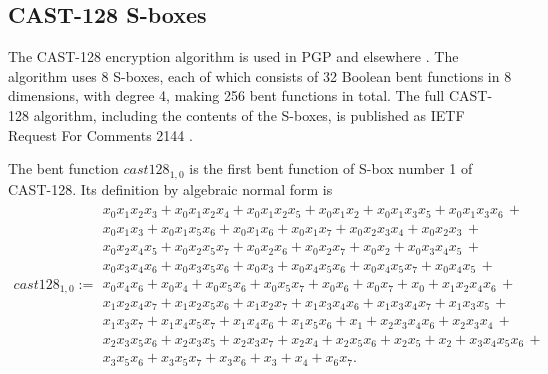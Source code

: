 \documentclass[12pt,a4paper]{article}
\begin{document}
\newpage
\subsection{CAST-128 S-boxes}
%
The CAST-128 encryption algorithm is used in PGP and elsewhere \cite{Ada97}.
The algorithm uses 8 S-boxes, each of which consists of 32 Boolean bent functions in 8 dimensions,
with degree 4, making 256 bent functions in total.
The full CAST-128 algorithm, including the contents of the S-boxes,
is published as IETF Request For Comments 2144 \cite{RFC2144}.

The bent function $cast128_{1,0}$ is the first bent function of S-box number 1 of CAST-128.
Its definition by algebraic normal form is
\footnotesize{}
\begin{align*}
cast128_{1,0} :=
\begin{array}{l}
x_{0} x_{1} x_{2} x_{3} + x_{0} x_{1} x_{2} x_{4} + x_{0} x_{1} x_{2} x_{5} + x_{0} x_{1} x_{2} + x_{0} x_{1} x_{3} x_{5} + x_{0} x_{1} x_{3} x_{6}\, +
\\
x_{0} x_{1} x_{3} + x_{0} x_{1} x_{5} x_{6} + x_{0} x_{1} x_{6} + x_{0} x_{1} x_{7} + x_{0} x_{2} x_{3} x_{4} + x_{0} x_{2} x_{3}\, +
\\
x_{0} x_{2} x_{4} x_{5} + x_{0} x_{2} x_{5} x_{7} + x_{0} x_{2} x_{6} + x_{0} x_{2} x_{7} + x_{0} x_{2} + x_{0} x_{3} x_{4} x_{5}\, +
\\
x_{0} x_{3} x_{4} x_{6} + x_{0} x_{3} x_{5} x_{6} + x_{0} x_{3} + x_{0} x_{4} x_{5} x_{6} + x_{0} x_{4} x_{5} x_{7} + x_{0} x_{4} x_{5}\, +
\\
x_{0} x_{4} x_{6} + x_{0} x_{4} + x_{0} x_{5} x_{6} + x_{0} x_{5} x_{7} + x_{0} x_{6} + x_{0} x_{7} + x_{0} + x_{1} x_{2} x_{4} x_{6}\, +
\\
x_{1} x_{2} x_{4} x_{7} + x_{1} x_{2} x_{5} x_{6} + x_{1} x_{2} x_{7} + x_{1} x_{3} x_{4} x_{6} + x_{1} x_{3} x_{4} x_{7} + x_{1} x_{3} x_{5}\, +
\\
x_{1} x_{3} x_{7} + x_{1} x_{4} x_{5} x_{7} + x_{1} x_{4} x_{6} + x_{1} x_{5} x_{6} + x_{1} + x_{2} x_{3} x_{4} x_{6} + x_{2} x_{3} x_{4}\, +
\\
x_{2} x_{3} x_{5} x_{6} + x_{2} x_{3} x_{5} + x_{2} x_{3} x_{7} + x_{2} x_{4} + x_{2} x_{5} x_{6} + x_{2} x_{5} + x_{2} + x_{3} x_{4} x_{5} x_{6}\, +
\\
x_{3} x_{5} x_{6} + x_{3} x_{5} x_{7} + x_{3} x_{6} + x_{3} + x_{4} + x_{6} x_{7}.
\end{array}
\end{align*}
\normalsize{}
\end{document}
